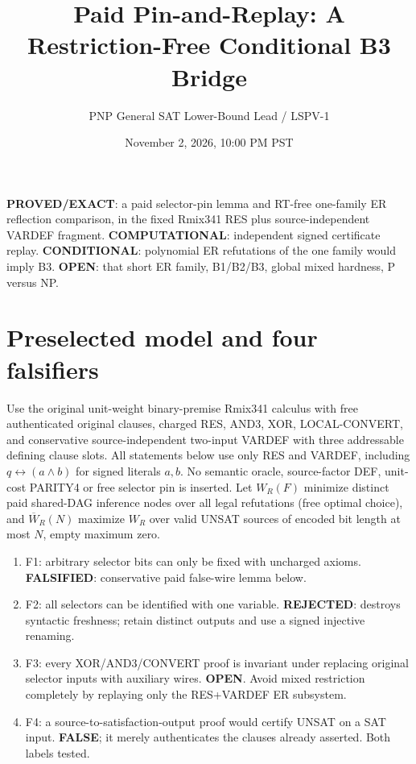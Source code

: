 \documentclass[11pt]{article}
\title{Paid Pin-and-Replay: A Restriction-Free Conditional B3 Bridge}
\author{PNP General SAT Lower-Bound Lead / LSPV-1}
\date{November 2, 2026, 10:00 PM PST}
\begin{document}
\maketitle
\noindent\textbf{PROVED/EXACT}: a paid selector-pin lemma and RT-free one-family ER reflection comparison, in the fixed Rmix341 RES plus source-independent VARDEF fragment. \textbf{COMPUTATIONAL}: independent signed certificate replay. \textbf{CONDITIONAL}: polynomial ER refutations of the one family would imply B3. \textbf{OPEN}: that short ER family, B1/B2/B3, global mixed hardness, P versus NP.

\section*{Preselected model and four falsifiers}
Use the original unit-weight binary-premise Rmix341 calculus with free authenticated original clauses, charged RES, AND3, XOR, LOCAL-CONVERT, and conservative source-independent two-input VARDEF with three addressable defining clause slots. All statements below use only RES and VARDEF, including \(q\leftrightarrow(a\land b)\) for signed literals \(a,b\). No semantic oracle, source-factor DEF, unit-cost PARITY4 or free selector pin is inserted. Let \(W_R(F)\) minimize distinct paid shared-DAG inference nodes over all legal refutations (free optimal choice), and \(\overline W_R(N)\) maximize \(W_R\) over valid UNSAT sources of encoded bit length at most \(N\), empty maximum zero.
\begin{enumerate}
\item[] F1: arbitrary selector bits can only be fixed with uncharged axioms. \textbf{FALSIFIED}: conservative paid false-wire lemma below.
\item[] F2: all selectors can be identified with one variable. \textbf{REJECTED}: destroys syntactic freshness; retain distinct outputs and use a signed injective renaming.
\item[] F3: every XOR/AND3/CONVERT proof is invariant under replacing original selector inputs with auxiliary wires. \textbf{OPEN}. Avoid mixed restriction completely by replaying only the RES+VARDEF ER subsystem.
\item[] F4: a source-to-satisfaction-output proof would certify UNSAT on a SAT input. \textbf{FALSE}; it merely authenticates the clauses already asserted. Both labels tested.
\end{enumerate}
\end{document}
